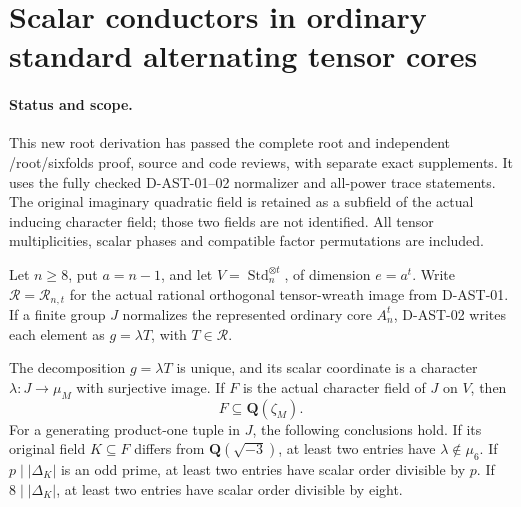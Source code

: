 \section{Scalar conductors in ordinary standard alternating tensor cores}
\label{sec:alternating-standard-conductor}

\paragraph{Status and scope.}
This new root derivation has passed the complete root and independent
/root/sixfolds proof, source and code reviews, with separate exact
supplements. It uses the fully checked D-AST-01--02 normalizer and all-power
trace statements. The original imaginary quadratic field is retained
as a subfield of the actual inducing character field; those two fields
are not identified. All tensor multiplicities, scalar phases and
compatible factor permutations are included.

Let $n\ge8$, put $a=n-1$, and let
$V=\operatorname{Std}_n^{\otimes t}$, of dimension $e=a^t$.
Write $\mathcal R=\mathcal R_{n,t}$ for the actual rational orthogonal
tensor-wreath image from D-AST-01. If a finite group $J$ normalizes
the represented ordinary core $A_n^t$, D-AST-02 writes each element
as $g=\lambda T$, with $T\in\mathcal R$.

\begin{lemma}
\label{HD-AST-04}
The decomposition $g=\lambda T$ is unique, and its scalar coordinate
is a character $\lambda:J\longrightarrow\mu_M$ with surjective image.
If $F$ is the actual character field of $J$ on $V$, then
\[
                         F\subseteq\mathbf Q(\zeta_M).
 \tag{ASC.1}
\]
For a generating product-one tuple in $J$, the following conclusions hold.
If its original field $K\subseteq F$ differs from
$\mathbf Q(\sqrt{-3})$, at least two entries have
$\lambda\notin\mu_6$. If $p\mid |\Delta_K|$ is an odd prime,
at least two entries have scalar order divisible by $p$.
If $8\mid |\Delta_K|$, at least two entries have scalar order
divisible by eight.
\end{lemma}

